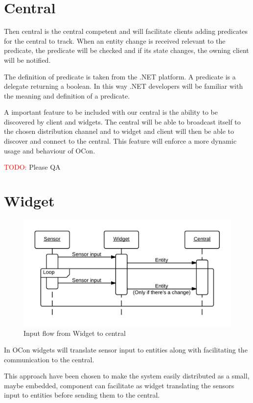 \documentclass[]{report}
\newcommand\todo[1]{\textcolor{red}{TODO: }#1\PackageWarning{TODO:}{TODO tag!!}}
\begin{document}
\section{Central}

Then central is the central competent and will facilitate clients adding predicates for the central to track. When an entity change is received relevant to the predicate, the predicate will be checked and if its state changes, the owning client will be notified.

The definition of predicate is taken from the .NET platform. A predicate is a delegate returning a boolean. In this way .NET developers will be familiar with the meaning and definition of a predicate.

A important feature to be included with our central is the ability to be discovered by client and widgets. The central will be able to broadcast itself to the chosen distribution channel and to widget and client will then be able to discover and connect to the central. This feature will enforce a more dynamic usage and behaviour of OCon.

\todo Please QA
 

\section{Widget}

\begin{figure}
\centering
\includegraphics[width=\linewidth]{sequencediagram-widget.png}
\caption{Input flow from Widget to central}
\label{fig:seqwidget}
\end{figure}


In OCon widgets will translate sensor input to entities along with facilitating the communication to the central.

This approach have been chosen to make the system easily distributed as a small, maybe embedded, component can facilitate as widget translating the sensors input to entities before sending them to the central.
\end{document}
